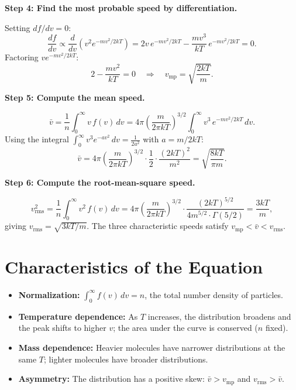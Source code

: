 \textbf{Step 4: Find the most probable speed by differentiation.}

Setting $df/dv = 0$:
\begin{equation}
\frac{df}{dv} \propto \frac{d}{dv}\!\left(v^{2}e^{-mv^{2}/2kT}\right) = 2v\,e^{-mv^{2}/2kT} - \frac{mv^{3}}{kT}\,e^{-mv^{2}/2kT} = 0.
\end{equation}
Factoring $ve^{-mv^{2}/2kT}$:
\begin{equation}
2 - \frac{mv^{2}}{kT} = 0 \quad\Longrightarrow\quad v_{\text{mp}} = \sqrt{\frac{2kT}{m}}.
\end{equation}

\textbf{Step 5: Compute the mean speed.}

\begin{equation}
\bar{v} = \frac{1}{n}\int_{0}^{\infty} v\,f(v)\,dv = 4\pi\left(\frac{m}{2\pi kT}\right)^{3/2}\int_{0}^{\infty} v^{3}\,e^{-mv^{2}/2kT}\,dv.
\end{equation}
Using the integral $\int_{0}^{\infty} v^{3}e^{-av^{2}}\,dv = \frac{1}{2a^{2}}$ with $a = m/2kT$:
\begin{equation}
\bar{v} = 4\pi\left(\frac{m}{2\pi kT}\right)^{3/2}\cdot\frac{1}{2}\cdot\frac{(2kT)^{2}}{m^{2}} = \sqrt{\frac{8kT}{\pi m}}.
\end{equation}

\textbf{Step 6: Compute the root-mean-square speed.}

\begin{equation}
v_{\text{rms}}^{2} = \frac{1}{n}\int_{0}^{\infty} v^{2}\,f(v)\,dv = 4\pi\left(\frac{m}{2\pi kT}\right)^{3/2}\cdot\frac{(2kT)^{5/2}}{4m^{5/2}\cdot\Gamma(5/2)} = \frac{3kT}{m},
\end{equation}
giving $v_{\text{rms}} = \sqrt{3kT/m}$. The three characteristic speeds satisfy $v_{\text{mp}} < \bar{v} < v_{\text{rms}}$.

\section*{Characteristics of the Equation}

\begin{itemize}
  \item \textbf{Normalization:} $\int_{0}^{\infty} f(v)\,dv = n$, the total number density of particles.
  \item \textbf{Temperature dependence:} As $T$ increases, the distribution broadens and the peak shifts to higher $v$; the area under the curve is conserved ($n$ fixed).
  \item \textbf{Mass dependence:} Heavier molecules have narrower distributions at the same $T$; lighter molecules have broader distributions.
  \item \textbf{Asymmetry:} The distribution has a positive skew: $\bar{v} > v_{\text{mp}}$ and $v_{\text{rms}} > \bar{v}$.
\end{itemize}
